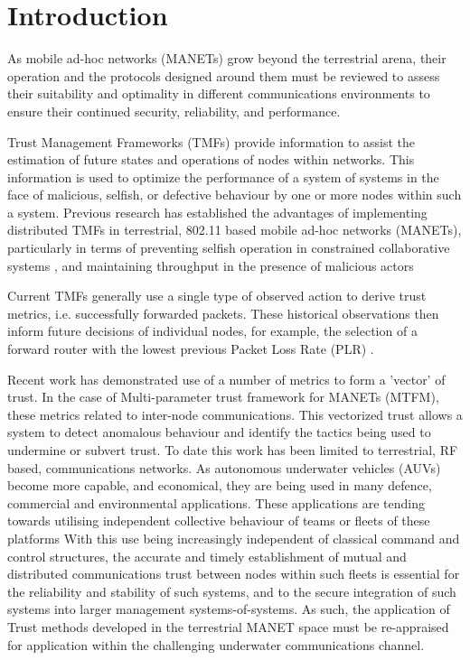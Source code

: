 \documentclass[runningheads,a4paper]{llncs}
\begin{document}
\section{Introduction}\label{sec:introduction}

As mobile ad-hoc networks (MANETs) grow beyond the terrestrial arena, their operation and the protocols designed around them must be reviewed to assess their suitability and optimality in different communications environments to ensure their continued security, reliability, and performance.

Trust Management Frameworks (TMFs) provide information to assist the estimation of future states and operations of nodes within networks.
This information is used to optimize the performance of a system of systems in the face of malicious, selfish, or defective behaviour by one or more nodes within such a system.
Previous research has established the advantages of implementing distributed TMFs in terrestrial, 802.11 based mobile ad-hoc networks (MANETs), particularly in terms of preventing selfish operation in constrained collaborative systems \cite{Li2007}, and maintaining throughput in the presence of malicious actors \cite{Buchegger2002}

Current TMFs generally use a single type of observed action to derive trust metrics, i.e. successfully forwarded packets. These historical observations then inform future decisions of individual nodes, for example, the selection of a forward router with the lowest previous Packet Loss Rate (PLR) \cite{Li2008}.

Recent work has demonstrated use of a number of metrics to form a 'vector’ of trust.
In the case of Multi-parameter trust framework for MANETs (MTFM)\cite{Guo2012}, these metrics related to inter-node communications.
This vectorized trust allows a system to detect anomalous behaviour and identify the tactics being used to undermine or subvert trust.
To date this work has been limited to terrestrial, RF based, communications networks.
As autonomous underwater vehicles (AUVs) become more capable, and economical, they are being used in many defence, commercial and environmental applications.
These applications are tending towards utilising  independent collective behaviour of teams or fleets of these platforms \cite{Caiti2011}
With this use being increasingly independent of classical command and control structures, the accurate and timely establishment of mutual and distributed communications trust between nodes within such fleets is essential for the reliability and stability of such systems, and to the secure integration of such systems into larger management systems-of-systems.
As such, the application of Trust methods developed in the terrestrial MANET space must be re-appraised for application within the challenging underwater communications channel.
\end{document}
